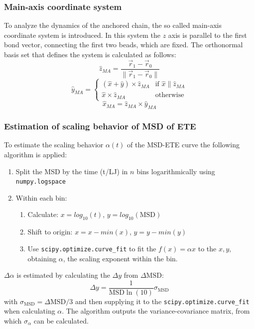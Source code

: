 \documentclass[
    paper=A4,pagesize=automedia,fontsize=12pt,
    BCOR=15mm,DIV=22,
    twoside,headinclude,footinclude=false,
    fleqn,             %
    bibliography=totocnumbered,          %
    listof=totoc,                %
    listof=flat,                 %
    cleardoublepage=empty      %
    numbers=endperiod
]{scrartcl}
\begin{document}
\subsubsection{Main-axis coordinate system}\label{sec:main-axis}
To analyze the dynamics of the anchored chain, the so called main-axis coordinate
system is introduced. In this system the $z$ axis is parallel to the
first bond vector, connecting the first two beads, which are fixed.
The orthonormal basis set that defines the system is calculated as follows:
\begin{equation}
    \hat{z}_{MA} = \frac{\vec{r}_1 - \vec{r}_0}{\| \vec{r}_1 - \vec{r}_0 \|}
\end{equation}
\begin{equation}
    \hat{y}_{MA} = 
    \begin{cases}
        (\hat{x} + \hat{y}) \times \hat{z}_{MA} & \text{if } \hat{x} \parallel \hat{z}_{MA} \\
        \hat{x} \times \hat{z}_{MA} & \text{otherwise}
    \end{cases}
\end{equation}
\begin{equation}
    \hat{x}_{MA} = \hat{z}_{MA} \times \hat{y}_{MA} 
\end{equation}

\subsubsection{Estimation of scaling behavior of MSD of ETE} \label{sec:est-alpha-msd}
To estimate the scaling behavior $\alpha(t)$ of the MSD-ETE curve the following
algorithm is applied:
\begin{enumerate}
    \item Split the MSD by the time (t/LJ) in $n$ bins logarithmically using
    \texttt{numpy.logspace} \cite{harris2020array}
    \item Within each bin:
    \begin{enumerate}
        \item Calculate: $x=log_{10}(t)$, $y=log_{10}(\text{MSD})$
        \item Shift to origin: $x=x-min(x)$, $y=y-min(y)$
        \item Use \texttt{scipy.optimize.curve_fit} 
        \cite{2020SciPy-NMeth} to fit the $f(x) = \alpha x$ to the $x,y$,
        obtaining $\alpha$, the scaling exponent within the bin.
    \end{enumerate}
\end{enumerate}  
$\Delta \alpha$ is estimated by calculating the 
$\Delta y$ from $\Delta \text{MSD}$:
\begin{equation}
    \Delta y = \frac{1}{\text{MSD} \ln(10)} \sigma_{\text{MSD}}
\end{equation}
with $\sigma_{\text{MSD}}=\Delta \text{MSD} / 3$
and then supplying it to the  
\texttt{scipy.optimize.curve_fit} \cite{2020SciPy-NMeth}
when calculating $\alpha$. The algorithm outputs the variance-covariance
matrix, from which $\sigma_{\alpha}$ can be calculated.
\end{document}
